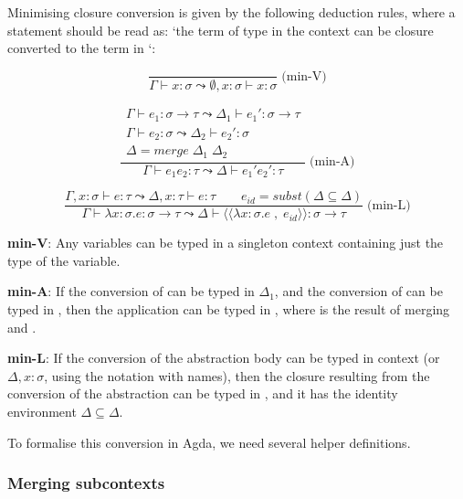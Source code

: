 \documentclass[bsc,frontabs,twoside,singlespacing,parskip,deptreport]{infthesis}
\theoremstyle{definition}
\begin{document}
Minimising closure conversion is given by the following deduction
rules, where a statement  should be read as:
`the term  of type  in the context  can be closure
converted to the term  in `:

\begin{minipage}{.5\textwidth}
  \[
    \frac
    {}
    {\Gamma \vdash x : \sigma \leadsto \emptyset , x : \sigma \vdash x : \sigma}
    \;\text{(min-V)}
  \]
\end{minipage}%
\begin{minipage}{.5\textwidth}
  \[
    \frac
    {
      \begin{matrix}
        \Gamma \vdash e_1 : \sigma \to \tau \leadsto \Delta_1 \vdash
        e_1' : \sigma \to \tau \\
        \Gamma \vdash e_2 : \sigma \leadsto \Delta_2 \vdash e_2' :
        \sigma \\
        \Delta = merge \; \Delta_1 \; \Delta_2
      \end{matrix}
      }
    {\Gamma ⊢ e_1 e_2 : \tau  \leadsto \Delta  \vdash e_1' e_2' : \tau}
     \;\text{(min-A)}
  \]
\end{minipage}

\[
  \frac {\Gamma , x : \sigma ⊢ e : \tau \leadsto \Delta , x : \tau
    \vdash e : \tau \quad \quad e_{id} = subst ( \Delta \subseteq
    \Delta )}
  {\Gamma \vdash \lambda x : \sigma . e : \sigma \to \tau \leadsto
    \Delta \vdash \langle\langle \lambda x : \sigma . e \; , \; e_{id}
    \rangle\rangle : \sigma \to \tau} \; \text{(min-L)}
\]

\textbf{min-V}: Any variables can be typed in a singleton context
containing just the type of the variable.

\textbf{min-A}: If the conversion  of  can be typed in
$\Delta_1$, and the conversion  of  can be typed in ,
then the application  can be typed in , where 
is the result of merging  and .

\textbf{min-L}: If the conversion  of the abstraction body
 can be typed in context  (or $\Delta, x : \sigma$,
using the notation with names), then the closure resulting from the
conversion of the abstraction can be typed in , and it has the
identity environment $\Delta \subseteq \Delta$.

To formalise this conversion in Agda, we need several helper
definitions.

\subsubsection{Merging subcontexts}
\label{sec:merging-subcontexts}
\end{document}
